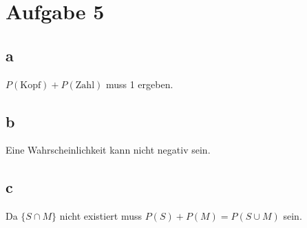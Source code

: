 
\section{Aufgabe 5}
\subsection{a}
$P(\text{Kopf}) + P(\text{Zahl})$ muss 1 ergeben. 

\subsection{b}
Eine Wahrscheinlichkeit kann nicht negativ sein. 

\subsection{c}
Da $\{S \cap M\}$ nicht existiert muss $P(S) + P(M) = P(S \cup M)$ sein. 

